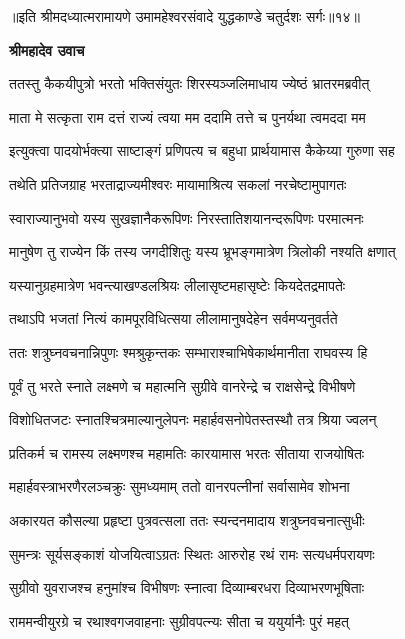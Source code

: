 {॥इति श्रीमदध्यात्मरामायणे उमामहेश्वरसंवादे युद्धकाण्डे
चतुर्दशः सर्गः॥१४॥
}




\textbf{श्रीमहादेव उवाच}

\twolineshloka
{ततस्तु कैकयीपुत्रो भरतो भक्तिसंयुतः}
{शिरस्यञ्जलिमाधाय ज्येष्ठं भ्रातरमब्रवीत्} %

\twolineshloka
{माता मे सत्कृता राम दत्तं राज्यं त्वया मम}
{ददामि तत्ते च पुनर्यथा त्वमददा मम} %

\twolineshloka
{इत्युक्त्वा पादयोर्भक्त्या साष्टाङ्गं प्रणिपत्य च}
{बहुधा प्रार्थयामास कैकेय्या गुरुणा सह} %

\twolineshloka
{तथेति प्रतिजग्राह भरताद्राज्यमीश्वरः}
{मायामाश्रित्य सकलां नरचेष्टामुपागतः} %

\twolineshloka
{स्वाराज्यानुभवो यस्य सुखज्ञानैकरूपिणः}
{निरस्तातिशयानन्दरूपिणः परमात्मनः} %

\twolineshloka
{मानुषेण तु राज्येन किं तस्य जगदीशितुः}
{यस्य भ्रूभङ्गमात्रेण त्रिलोकी नश्यति क्षणात्} %

\twolineshloka
{यस्यानुग्रहमात्रेण भवन्त्याखण्डलश्रियः}
{लीलासृष्टमहासृष्टेः कियदेतद्रमापतेः} %

\twolineshloka
{तथाऽपि भजतां नित्यं कामपूरविधित्सया}
{लीलामानुषदेहेन सर्वमप्यनुवर्तते} %

\twolineshloka
{ततः शत्रुघ्नवचनान्निपुणः श्मश्रुकृन्तकः}
{सम्भाराश्चाभिषेकार्थमानीता राघवस्य हि} %

\twolineshloka
{पूर्वं तु भरते स्नाते लक्ष्मणे च महात्मनि}
{सुग्रीवे वानरेन्द्रे च राक्षसेन्द्रे विभीषणे} %

\twolineshloka
{विशोधितजटः स्नातश्चित्रमाल्यानुलेपनः}
{महार्हवसनोपेतस्तस्थौ तत्र श्रिया ज्वलन्} %

\twolineshloka
{प्रतिकर्म च रामस्य लक्ष्मणश्च महामतिः}
{कारयामास भरतः सीताया राजयोषितः} %

\twolineshloka
{महार्हवस्त्राभरणैरलञ्चक्रुः सुमध्यमाम्}
{ततो वानरपत्नीनां सर्वासामेव शोभना} %

\twolineshloka
{अकारयत कौसल्या प्रहृष्टा पुत्रवत्सला}
{ततः स्यन्दनमादाय शत्रुघ्नवचनात्सुधीः} %

\twolineshloka
{सुमन्त्रः सूर्यसङ्काशं योजयित्वाऽग्रतः स्थितः}
{आरुरोह रथं रामः सत्यधर्मपरायणः} %

\twolineshloka
{सुग्रीवो युवराजश्च हनुमांश्च विभीषणः}
{स्नात्वा दिव्याम्बरधरा दिव्याभरणभूषिताः} %

\twolineshloka
{राममन्वीयुरग्रे च रथाश्वगजवाहनाः}
{सुग्रीवपत्न्यः सीता च ययुर्यानैः पुरं महत्} %

